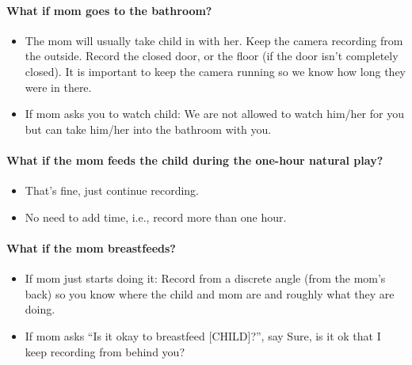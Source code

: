 \documentclass[
  12pt,
]{book}
\providecommand{\tightlist}{%
  \setlength{\itemsep}{0pt}\setlength{\parskip}{0pt}}
\begin{document}
\hypertarget{what-if-mom-goes-to-the-bathroom}{%
\paragraph*{What if mom goes to the bathroom?}\label{what-if-mom-goes-to-the-bathroom}}

\begin{itemize}
\tightlist
\item
  The mom will usually take child in with her. Keep the camera recording from the outside. Record the closed door, or the floor (if the door isn't completely closed). It is important to keep the camera running so we know how long they were in there.
\item
  If mom asks you to watch child: We are not allowed to watch him/her for you but can take him/her into the bathroom with you.
\end{itemize}

\hypertarget{what-if-the-mom-feeds-the-child-during-the-one-hour-natural-play}{%
\paragraph*{What if the mom feeds the child during the one-hour natural play?}\label{what-if-the-mom-feeds-the-child-during-the-one-hour-natural-play}}

\begin{itemize}
\tightlist
\item
  That's fine, just continue recording.
\item
  No need to add time, i.e., record more than one hour.
\end{itemize}

\hypertarget{what-if-the-mom-breastfeeds}{%
\paragraph*{What if the mom breastfeeds?}\label{what-if-the-mom-breastfeeds}}

\begin{itemize}
\tightlist
\item
  If mom just starts doing it: Record from a discrete angle (from the mom's back) so you know where the child and mom are and roughly what they are doing.
\item
  If mom asks ``Is it okay to breastfeed {[}CHILD{]}?'', say Sure, is it ok that I keep recording from behind you?
\end{itemize}
\end{document}
